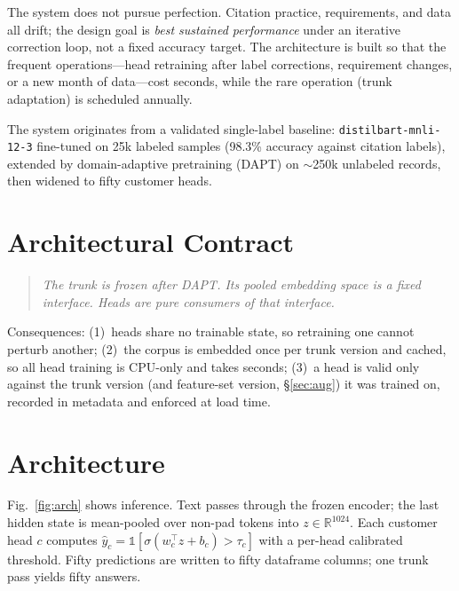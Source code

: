 \documentclass[conference]{IEEEtran}
\begin{document}
The system does not pursue perfection. Citation practice, requirements, and data all drift; the design goal is \emph{best sustained performance} under an iterative correction loop, not a fixed accuracy target. The architecture is built so that the frequent operations---head retraining after label corrections, requirement changes, or a new month of data---cost seconds, while the rare operation (trunk adaptation) is scheduled annually.

The system originates from a validated single-label baseline: \texttt{distilbart-mnli-12-3} fine-tuned on 25k labeled samples (98.3\% accuracy against citation labels), extended by domain-adaptive pretraining (DAPT) on $\sim$250k unlabeled records, then widened to fifty customer heads.

\section{Architectural Contract}
\begin{quote}
\emph{The trunk is frozen after DAPT. Its pooled embedding space is a fixed interface. Heads are pure consumers of that interface.}
\end{quote}
Consequences: (1)~heads share no trainable state, so retraining one cannot perturb another; (2)~the corpus is embedded once per trunk version and cached, so all head training is CPU-only and takes seconds; (3)~a head is valid only against the trunk version (and feature-set version, \S\ref{sec:aug}) it was trained on, recorded in metadata and enforced at load time.

\section{Architecture}
Fig.~\ref{fig:arch} shows inference. Text passes through the frozen encoder; the last hidden state is mean-pooled over non-pad tokens into $z \in \mathbb{R}^{1024}$. Each customer head $c$ computes $\hat{y}_c = \mathbb{1}[\sigma(w_c^\top z + b_c) > \tau_c]$ with a per-head calibrated threshold. Fifty predictions are written to fifty dataframe columns; one trunk pass yields fifty answers.
\end{document}
